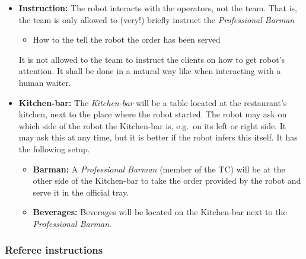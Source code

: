 \begin{itemize}
	\item \textbf{Instruction:} The robot interacts with the operators, not the team. That is, the team is only allowed to (very!) briefly instruct the \textit{Professional Barman}
	\begin{itemize}
		\item How to the tell the robot the order has been served
	\end{itemize}
	It is not allowed to the team to instruct the clients on how to get robot's attention. It shall be done in a natural way like when interacting with a human waiter.

	\item \textbf{Kitchen-bar:} The \textit{Kitchen-bar} will be a table located at the restaurant's kitchen, next to the place where the robot started.
	The robot may ask on which side of the robot the Kitchen-bar is, e.g.~on its left or right side. It may ask this at any time, but it is better if the robot infers this itself.
	It has the following setup.
	\begin{itemize}
		\item \textbf{Barman:} A \textit{Professional Barman} (member of the TC) will be at the other side of the Kitchen-bar to take the order provided by the robot and serve it in the official tray.
		\item \textbf{Beverages:} Beverages will be located on the Kitchen-bar next to the \textit{Professional Barman}.
	\end{itemize}

\end{itemize}


\subsubsection{Referee instructions}

